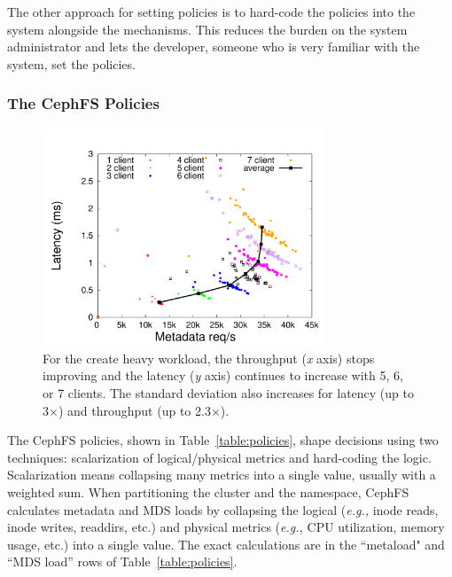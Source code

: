 The other approach for setting policies is to hard-code the policies into the system alongside the mechanisms. This reduces the burden on the system administrator and lets the developer, someone who is very familiar with the system, set the policies. 

\subsubsection*{The CephFS Policies}
\label{the-cephfs-policies}
\begin{figure}[tb]
	\centering
	\includegraphics[width=0.75\textwidth]{./chapters/mantle/figures/creates-latency-thruput-clients.pdf}
    \caption{For the create heavy workload, the throughput ({\it x} axis) stops improving and the latency ({\it y} axis) continues to increase with 5, 6, or 7 clients. The standard deviation also increases for latency (up to 3\(\times\)) and throughput (up to 2.3\(\times\)). \label{figure:creates-latency-thruput-clients}} 
\end{figure}

The CephFS policies, shown in Table~\ref{table:policies}, shape decisions using two techniques: scalarization of logical/physical metrics and hard-coding the logic. Scalarization means collapsing many metrics into a single value, usually with a weighted sum. When partitioning the cluster and the namespace, CephFS calculates metadata and MDS loads by collapsing the logical ({\it e.g.,} inode reads, inode writes, readdirs, etc.) and physical metrics ({\it e.g.,} CPU utilization, memory usage, etc.) into a single value. The exact calculations are in the ``metaload" and ``MDS load'' rows of Table~\ref{table:policies}. 

